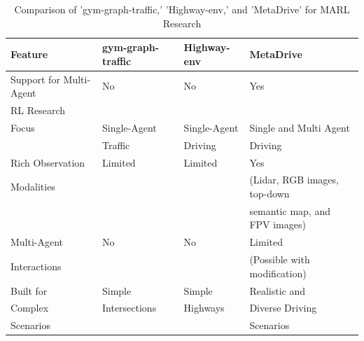 \begin{table}[H]
    \centering
    \caption{Comparison of 'gym-graph-traffic,' 'Highway-env,' and 'MetaDrive' for MARL Research}
    \label{tab:comparison}
    \begin{tabularx}{\textwidth}{@{}lXXX@{}}
        \toprule
        \multirow{2}{*}{\textbf{Feature}} & \textbf{gym-graph-traffic} & \textbf{Highway-env} & \textbf{MetaDrive}           \\
        \midrule
        Support for Multi-Agent           & No                         & No                   & Yes                           \\
        RL Research                       &                            &                      &                               \\
        \midrule
        Focus                             & Single-Agent               & Single-Agent         & Single and Multi Agent        \\
        & Traffic                    & Driving              & Driving                       \\
        \midrule
        Rich Observation                  & Limited                    & Limited              & Yes                           \\
        Modalities                        &                            &                      & (Lidar, RGB images, top-down  \\
        &                            &                      & semantic map, and FPV images) \\
        \midrule
        Multi-Agent                       & No                         & No                   & Limited                       \\
        Interactions                      &                            &                      & (Possible with modification)  \\
        \midrule
        Built for                         & Simple                     & Simple               & Realistic and                 \\
        Complex                           & Intersections              & Highways             & Diverse Driving               \\
        Scenarios                         &                            &                      & Scenarios                     \\
        \bottomrule
    \end{tabularx}
\end{table}
